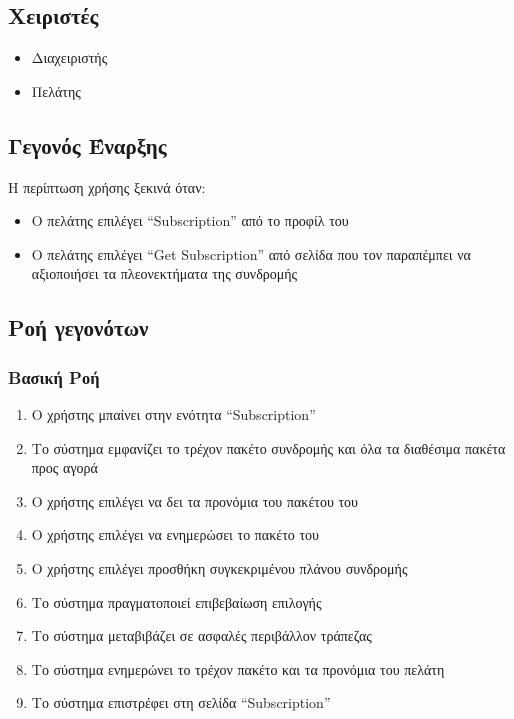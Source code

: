 \documentclass[12pt,a4paper,twoside]{book}
\begin{document}
\subsection{Χειριστές}
\begin{itemize}
  \item Διαχειριστής
  \item Πελάτης
\end{itemize}

\subsection{Γεγονός Έναρξης}
Η περίπτωση χρήσης ξεκινά όταν:
\begin{itemize}
  \item Ο πελάτης επιλέγει “Subscription” από το προφίλ του   %
  \item Ο πελάτης επιλέγει “Get Subscription” από σελίδα που τον παραπέμπει να αξιοποιήσει τα πλεονεκτήματα της συνδρομής %
\end{itemize}

\subsection{Ροή γεγονότων}

\subsubsection{Βασική Ροή}
\begin{enumerate}
  \item Ο χρήστης μπαίνει στην ενότητα “Subscription”  %
  \item Το σύστημα εμφανίζει το τρέχον πακέτο συνδρομής και όλα τα διαθέσιμα πακέτα προς αγορά  %
  \item Ο χρήστης επιλέγει να δει τα προνόμια του πακέτου του   %
  \item O χρήστης επιλέγει να ενημερώσει το πακέτο του   %
  \item Ο χρήστης επιλέγει προσθήκη συγκεκριμένου πλάνου συνδρομής   %
  \item Το σύστημα πραγματοποιεί επιβεβαίωση επιλογής   %
  \item Το σύστημα μεταβιβάζει σε ασφαλές περιβάλλον τράπεζας   %
  \item Το σύστημα ενημερώνει το τρέχον πακέτο και τα προνόμια του πελάτη   %
  \item Το σύστημα επιστρέφει στη σελίδα “Subscription”  %
\end{enumerate}
\end{document}
